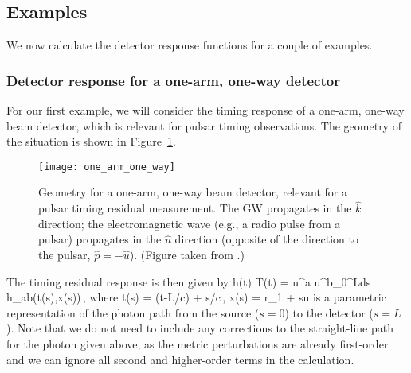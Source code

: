 \subsection{Examples}

We now calculate the detector response functions for a couple of
examples.

\subsubsection{Detector response for a one-arm, one-way detector}

For our first example, we will consider the timing response of a one-arm,
one-way beam detector, which is relevant for pulsar timing observations.
The geometry of the situation is shown in Figure~\ref{f:one_arm_one_way}.
%
\begin{figure}[htbp!]
\begin{center}
\texttt{[image: one\_arm\_one\_way]}
\caption{Geometry for a one-arm, one-way beam detector, relevant for 
a pulsar timing residual measurement.
The GW propagates in the $\hat k$ direction; the electromagnetic wave
(e.g., a radio pulse from a pulsar) propagates in the $\hat u$ direction
(opposite of the direction to the pulsar, $\hat p=-\hat u$).
(Figure taken from \cite{Romano-Cornish:2017}.)}
\label{f:one_arm_one_way}
\end{center}
\end{figure}
%
The timing residual response is then given by
\be
h(t)\equiv
\Delta T(t) =  u^a u^b\int_0^L{\rm d}s\> h_{ab}(t(s),\vec x(s))\,,
\ee
%
where
%
\be
t(s) = (t-L/c) + s/c\,, \qquad
\vec x(s) = \vec r_1 + s\hat u
\ee
%
is a parametric representation of the photon path from the 
source ($s=0$) to the detector ($s=L$).
Note that we do not need to include any corrections to
the straight-line path for the photon given above, as the 
metric perturbations are already first-order and we 
can ignore all second and higher-order terms in the calculation.


